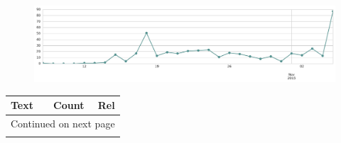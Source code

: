 \begin{figure}[htbp!]
    \centering
    \includegraphics[width=\textwidth]{twitter_all/report_images/topic-29-timeseries.jpg}
\end{figure}

\begin{longtable}{p{12.5cm}rr}
\toprule
Text & Count & Rel \\
\midrule
\endhead
\midrule
\multicolumn{3}{r}{{Continued on next page}} \\
\midrule
\endfoot


\end{longtable}
